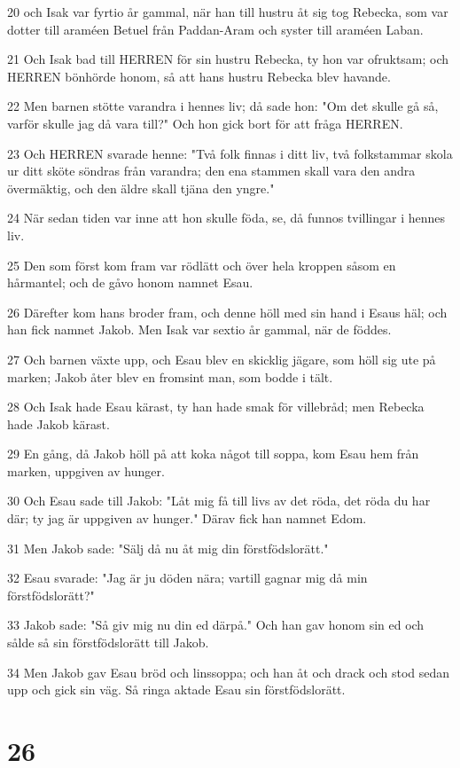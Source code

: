 \par 20 och Isak var fyrtio år gammal, när han till hustru åt sig tog Rebecka, som var dotter till araméen Betuel från Paddan-Aram och syster till araméen Laban.
\par 21 Och Isak bad till HERREN för sin hustru Rebecka, ty hon var ofruktsam; och HERREN bönhörde honom, så att hans hustru Rebecka blev havande.
\par 22 Men barnen stötte varandra i hennes liv; då sade hon: "Om det skulle gå så, varför skulle jag då vara till?" Och hon gick bort för att fråga HERREN.
\par 23 Och HERREN svarade henne: "Två folk finnas i ditt liv, två folkstammar skola ur ditt sköte söndras från varandra; den ena stammen skall vara den andra övermäktig, och den äldre skall tjäna den yngre."
\par 24 När sedan tiden var inne att hon skulle föda, se, då funnos tvillingar i hennes liv.
\par 25 Den som först kom fram var rödlätt och över hela kroppen såsom en hårmantel; och de gåvo honom namnet Esau.
\par 26 Därefter kom hans broder fram, och denne höll med sin hand i Esaus häl; och han fick namnet Jakob. Men Isak var sextio år gammal, när de föddes.
\par 27 Och barnen växte upp, och Esau blev en skicklig jägare, som höll sig ute på marken; Jakob åter blev en fromsint man, som bodde i tält.
\par 28 Och Isak hade Esau kärast, ty han hade smak för villebråd; men Rebecka hade Jakob kärast.
\par 29 En gång, då Jakob höll på att koka något till soppa, kom Esau hem från marken, uppgiven av hunger.
\par 30 Och Esau sade till Jakob: "Låt mig få till livs av det röda, det röda du har där; ty jag är uppgiven av hunger." Därav fick han namnet Edom.
\par 31 Men Jakob sade: "Sälj då nu åt mig din förstfödslorätt."
\par 32 Esau svarade: "Jag är ju döden nära; vartill gagnar mig då min förstfödslorätt?"
\par 33 Jakob sade: "Så giv mig nu din ed därpå." Och han gav honom sin ed och sålde så sin förstfödslorätt till Jakob.
\par 34 Men Jakob gav Esau bröd och linssoppa; och han åt och drack och stod sedan upp och gick sin väg. Så ringa aktade Esau sin förstfödslorätt.

\chapter{26}

